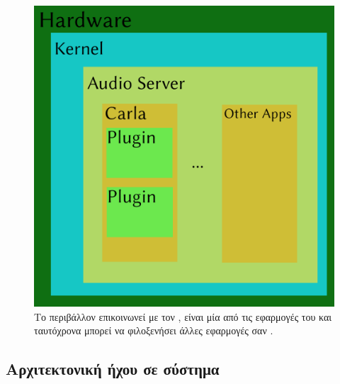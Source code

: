 \documentclass[12pt]{extarticle}
\begin{document}
\begin{figure}[!htb]
    \centering
    \includegraphics[width=\textwidth]{./assets/insides.png}
    \caption{Το περιβάλλον  επικοινωνεί με τον , είναι μία από τις εφαρμογές του και ταυτόχρονα μπορεί να φιλοξενήσει άλλες εφαρμογές σαν .}
\end{figure}



\subsection{Αρχιτεκτονική ήχου σε  σύστημα}
\end{document}
